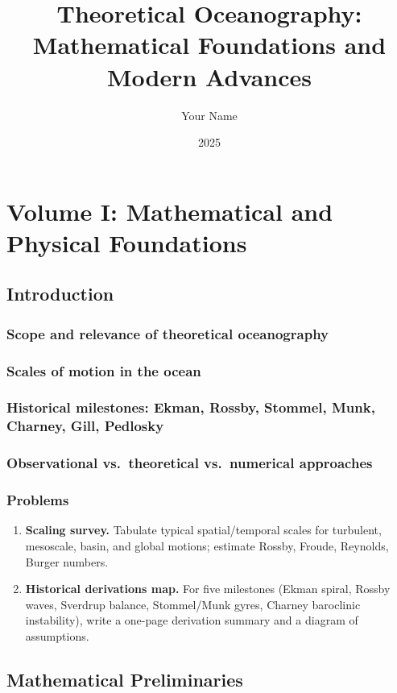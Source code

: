 \documentclass[12pt]{book}
\title{Theoretical Oceanography:\\Mathematical Foundations and Modern Advances}
\author{Your Name}
\date{2025}
\begin{document}
\maketitle
\tableofcontents

\part{Volume I: Mathematical and Physical Foundations}

\chapter{Introduction}
\section{Scope and relevance of theoretical oceanography}
\section{Scales of motion in the ocean}
\section{Historical milestones: Ekman, Rossby, Stommel, Munk, Charney, Gill, Pedlosky}
\section{Observational vs.\ theoretical vs.\ numerical approaches}
\section*{Problems}
\begin{enumerate}
  \item \textbf{Scaling survey.} Tabulate typical spatial/temporal scales for turbulent, mesoscale, basin, and global motions; estimate Rossby, Froude, Reynolds, Burger numbers.
  \item \textbf{Historical derivations map.} For five milestones (Ekman spiral, Rossby waves, Sverdrup balance, Stommel/Munk gyres, Charney baroclinic instability), write a one-page derivation summary and a diagram of assumptions.
\end{enumerate}

\chapter{Mathematical Preliminaries}
\end{document}
